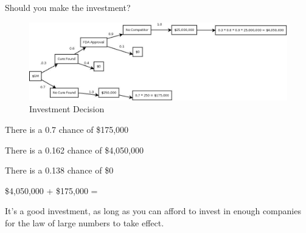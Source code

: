 \documentclass[landscape]{exam}
\begin{document}
  Should you make the investment? 


  \begin{figure}[H]
    \centering
    \includegraphics[scale = 0.25]{investment.jpeg}
    \caption{Investment Decision}
  \end{figure}

  \begin{solution}
    \begin{itemize*}
      \item There is a 0.7 chance of \$175,000 
      \item There is a 0.162 chance of \$4,050,000 
      \item There is a 0.138 chance of \$0
    \end{itemize*}
    
    \$4,050,000 + \$175,000 = 

    It's a good investment, as long as you can afford to invest in enough
    companies for the law of large numbers to take effect.

   \end{solution}
\end{document}

